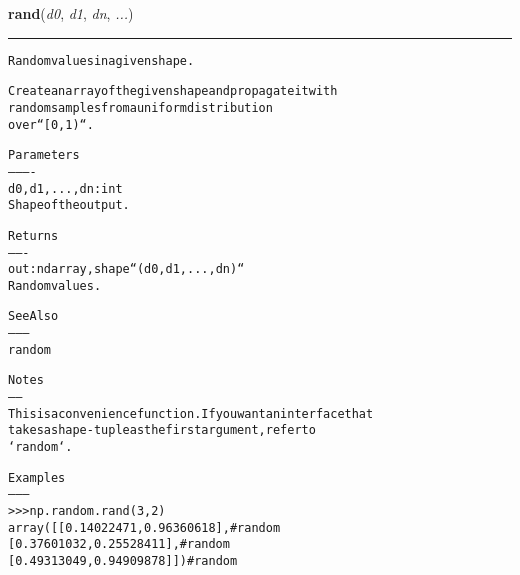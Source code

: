     \vspace{0.5ex}

\hspace{.8\funcindent}\begin{boxedminipage}{\funcwidth}

    \raggedright \textbf{rand}(\textit{d0}, \textit{d1}, \textit{dn}, \textit{...})

    \vspace{-1.5ex}

    \rule{\textwidth}{0.5\fboxrule}
\setlength{\parskip}{2ex}
\begin{alltt}
Random values in a given shape.

Create an array of the given shape and propagate it with
random samples from a uniform distribution
over ``[0, 1)``.

Parameters
----------
d0, d1, ..., dn : int
    Shape of the output.

Returns
-------
out : ndarray, shape ``(d0, d1, ..., dn)``
    Random values.

See Also
--------
random

Notes
-----
This is a convenience function. If you want an interface that
takes a shape-tuple as the first argument, refer to
`random`.

Examples
--------
{\textgreater}{\textgreater}{\textgreater} np.random.rand(3,2)
array([[ 0.14022471,  0.96360618],  \#random
       [ 0.37601032,  0.25528411],  \#random
       [ 0.49313049,  0.94909878]]) \#random
\end{alltt}

\setlength{\parskip}{1ex}
    \end{boxedminipage}

    \label{trunk:qstkutil:bollinger:randint}

    \vspace{0.5ex}

